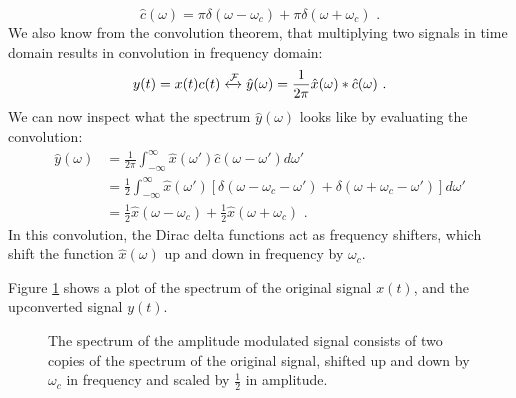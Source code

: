 \begin{equation}
\hat{c}(\omega) = \pi\delta(\omega - \omega_c) + \pi\delta(\omega + \omega_c)\,\,.
\end{equation}
We also know from the convolution theorem, that multiplying two
signals in time domain results in convolution in frequency domain:
\begin{equation}
y(t) = x(t) c(t) \xleftrightarrow{\mathcal{F}} \hat{y}(\omega) = \frac{1}{2\pi}\hat{x}(\omega) * \hat{c}(\omega)\,\,.
\end{equation}
We can now inspect what the spectrum $\hat{y}(\omega)$ looks like by
evaluating the convolution:
\begin{align}
\hat{y}(\omega) & = \frac{1}{2\pi}\int_{-\infty}^{\infty} \hat{x}(\omega') \hat{c}(\omega - \omega') d\omega' \\
  &= \frac{1}{2} \int_{-\infty}^{\infty} \hat{x}(\omega')\left[ \delta(\omega - \omega_c - \omega') + \delta(\omega + \omega_c - \omega') \right] d\omega' \\
   &= \frac{1}{2}\hat{x}(\omega-\omega_c) + \frac{1}{2}\hat{x}(\omega+\omega_c)\,\,.
\end{align}
In this convolution, the Dirac delta functions act as frequency
shifters, which shift the function $\hat{x}(\omega)$ up and down in
frequency by $\omega_c$.

Figure \ref{fig:am_spectra1} shows a plot of the spectrum of the original signal $x(t)$, and the
upconverted signal $y(t)$.
\begin{figure}
\begin{center}
\end{center}
\caption{The spectrum of the amplitude modulated signal consists of two
copies of the spectrum of the original signal, shifted up and down by
$\omega_c$ in frequency and scaled by $\frac{1}{2}$ in amplitude.}
\label{fig:am_spectra1}
\end{figure}

